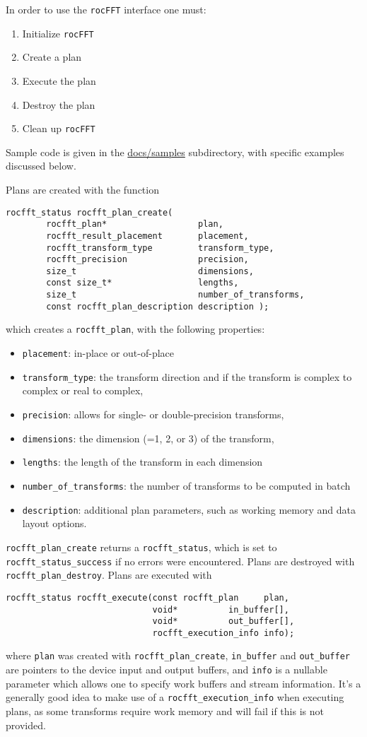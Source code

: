\documentclass[10pt]{article}
\renewcommand{\(}{\left(}
\renewcommand{\)}{\right)}
\begin{document}
In order to use the \texttt{rocFFT} interface one must:
\begin{enumerate}
\item Initialize \texttt{rocFFT} 
\item Create a plan
\item Execute the plan
\item Destroy the plan
\item Clean up \texttt{rocFFT}
\end{enumerate}
Sample code is given in the \url{docs/samples} subdirectory, with
specific examples discussed below.

Plans are created with the function
\begin{lstlisting}
rocfft_status rocfft_plan_create(
        rocfft_plan*                  plan,
        rocfft_result_placement       placement,
        rocfft_transform_type         transform_type,
        rocfft_precision              precision,
        size_t                        dimensions,
        const size_t*                 lengths,
        size_t                        number_of_transforms,
        const rocfft_plan_description description );
\end{lstlisting}
which creates a \lstinline{rocfft_plan}, with the following properties:
\begin{itemize}
\item \lstinline{placement}: in-place or out-of-place
\item \lstinline{transform_type}: the transform
  direction and if the transform is complex to complex or real to complex,
\item \lstinline{precision}: allows for single- or
  double-precision transforms,
\item \lstinline{dimensions}: the dimension (=1, 2, or 3) of the
  transform,
\item \lstinline{lengths}: the length of the transform in each dimension
\item \lstinline{number_of_transforms}: the number of transforms to be
  computed in batch
\item \lstinline{description}: additional plan parameters, such as
  working memory and data layout options.
\end{itemize}
\lstinline{rocfft_plan_create} returns a \lstinline{rocfft_status},
which is set to \lstinline{rocfft_status_success} if no errors were
encountered.  Plans are destroyed with
\lstinline{rocfft_plan_destroy}.  Plans are executed with
\begin{lstlisting}
rocfft_status rocfft_execute(const rocfft_plan     plan,
                             void*          in_buffer[],
                             void*          out_buffer[],
                             rocfft_execution_info info);
\end{lstlisting}
where \lstinline{plan} was created with
\lstinline{rocfft_plan_create}, \lstinline{in_buffer} and
\lstinline{out_buffer} are pointers to the device input and output
buffers, and \lstinline{info} is a nullable parameter which allows one
to specify work buffers and stream information.  It's a generally good
idea to make use of a \lstinline{rocfft_execution_info} when executing
plans, as some transforms require work memory and will fail if this is
not provided.
\end{document}
